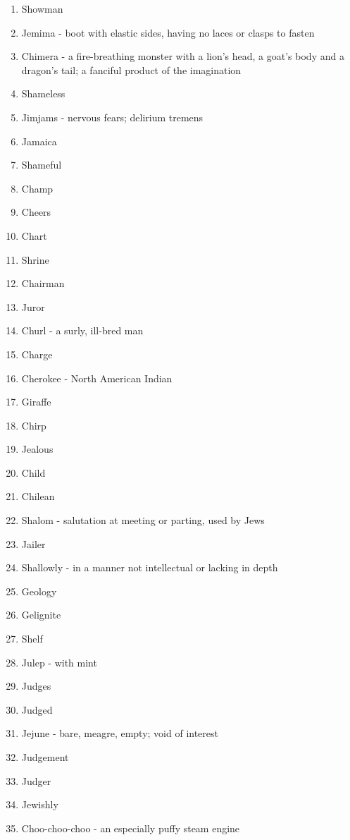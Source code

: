 \begin{enumerate}
        \item Showman
        \item Jemima - boot with elastic sides, having no laces or clasps to fasten
        \item Chimera - a fire-breathing monster with a lion's head, a goat's body and a dragon's tail; a fanciful product of the imagination
        \item Shameless
        \item Jimjams - nervous fears; delirium tremens
        \item Jamaica
        \item Shameful
        \item Champ
        \item Cheers
        \item Chart
        \item Shrine
        \item Chairman
        \item Juror
        \item Churl - a surly, ill-bred man
        \item Charge
        \item Cherokee - North American Indian
        \item Giraffe
        \item Chirp
        \item Jealous
        \item Child
        \item Chilean
        \item Shalom - salutation at meeting or parting, used by Jews
        \item Jailer
        \item Shallowly - in a manner not intellectual or lacking in depth
        \item Geology
        \item Gelignite
        \item Shelf
        \item Julep - with mint
        \item Judges
        \item Judged
        \item Jejune - bare, meagre, empty; void of interest
        \item Judgement
        \item Judger
        \item Jewishly
        \item Choo-choo-choo - an especially puffy steam engine

\end{enumerate}
